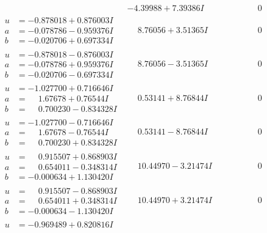 \documentclass[1p]{elsarticle_modified}
\theoremstyle{definition}
\begin{document}
$$\begin{array}{c|c|c}
 & -4.39988 + 7.39386 I & \phantom{-0.000000 } 0 \\ \hline\begin{aligned}
u &= -0.878018 + 0.876003 I \\
a &= -0.078786 - 0.959376 I \\
b &= -0.020706 + 0.697334 I\end{aligned}
 & \phantom{-}8.76056 + 3.51365 I & \phantom{-0.000000 } 0 \\ \hline\begin{aligned}
u &= -0.878018 - 0.876003 I \\
a &= -0.078786 + 0.959376 I \\
b &= -0.020706 - 0.697334 I\end{aligned}
 & \phantom{-}8.76056 - 3.51365 I & \phantom{-0.000000 } 0 \\ \hline\begin{aligned}
u &= -1.027700 + 0.716646 I \\
a &= \phantom{-}1.67678 + 0.76544 I \\
b &= \phantom{-}0.700230 - 0.834328 I\end{aligned}
 & \phantom{-}0.53141 + 8.76844 I & \phantom{-0.000000 } 0 \\ \hline\begin{aligned}
u &= -1.027700 - 0.716646 I \\
a &= \phantom{-}1.67678 - 0.76544 I \\
b &= \phantom{-}0.700230 + 0.834328 I\end{aligned}
 & \phantom{-}0.53141 - 8.76844 I & \phantom{-0.000000 } 0 \\ \hline\begin{aligned}
u &= \phantom{-}0.915507 + 0.868903 I \\
a &= \phantom{-}0.654011 - 0.348314 I \\
b &= -0.000634 + 1.130420 I\end{aligned}
 & \phantom{-}10.44970 - 3.21474 I & \phantom{-0.000000 } 0 \\ \hline\begin{aligned}
u &= \phantom{-}0.915507 - 0.868903 I \\
a &= \phantom{-}0.654011 + 0.348314 I \\
b &= -0.000634 - 1.130420 I\end{aligned}
 & \phantom{-}10.44970 + 3.21474 I & \phantom{-0.000000 } 0 \\ \hline\begin{aligned}
u &= -0.969489 + 0.820816 I \\

\end{aligned}
\end{array}$$
\end{document}
